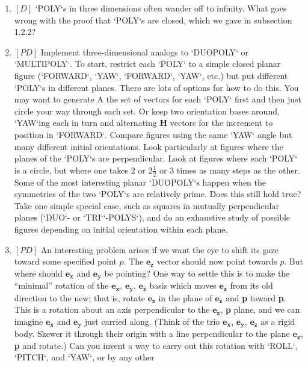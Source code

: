 \documentclass{book}
\begin{document}
\begin{enumerate}
\item $[D]$ \textsc{`POLY`}s in three dimensions often wander off to infinity. What goes
wrong with the proof that \textsc{`POLY`}s are closed, which we gave in subsection
1.2.2?  
\item $[PD]$ Implement three-dimensional analogs to \textsc{`DUOPOLY`} or \textsc{`MULTIPOLY`}.
To start, restrict each \textsc{`POLY`} to a simple closed planar figure (\textsc{`FORWARD`},
\textsc{`YAW`}, \textsc{`FORWARD`}, \textsc{`YAW`}, etc.) but put different \textsc{`POLY`}s in different planes.
There are lots of options for how to do this. You may want to generate A
the set of vectors for each \textsc{`POLY`} first and then just circle your way
through each set. Or keep two orientation bases around, \textsc{`YAW`}ing each in
turn and alternating \textbf{H} vectors for the increment to position in \textsc{`FORWARD`}.
Compare figures using the same \textsc{`YAW`} angle but many different initial
orientations. Look particularly at figures where the planes of the \textsc{`POLY`}s
are perpendicular. Look at figures where each \textsc{`POLY`} is a circle, but where
one takes 2 or 2$\frac{1}{2}$ or 3 times as many steps as the other. Some of the
most interesting planar \textsc{`DUOPOLY`}s happen when the symmetries of the two \textsc{`POLY`}s are relatively prime. Does this still hold true? Take one simple
special case, such as squares in mutually perpendicular planes (\textsc{`DUO`}- or
\textsc{`TRI`}\textsc{`-POLYS`}), and do an exhaustive study of possible figures depending on
initial orientation within each plane.
\item $[PD]$ An interesting problem arises if we want the eye to shift its gaze
toward some specified point $p$. The $\mathbf{e_z}$ vector should now point towards
$p$. But where should $\mathbf{e_x}$ and $\mathbf{e_y}$ be pointing? One way to settle this is
to make the ``minimal'' rotation of the $\mathbf{e_x}$, $\mathbf{e_y}$, $\mathbf{e_z}$ basis which moves $\mathbf{e_z}$
from its old direction to the new; that is, rotate $\mathbf{e_z}$ in the plane of $\mathbf{e_z}$
and \textbf{p} toward \textbf{p}. This is a rotation about an axis perpendicular to the
$\mathbf{e_z}$, \textbf{p} plane, and we can imagine $\mathbf{e_x}$ and $\mathbf{e_y}$ just carried along. (Think of
the trio $\mathbf{e_x}$, $\mathbf{e_y}$, $\mathbf{e_z}$ as a rigid body. Skewer it through their origin with a
line perpendicular to the plane $\mathbf{e_z}$, \textbf{p} and rotate.) Can you invent a way
to carry out this rotation with \textsc{`ROLL`}, \textsc{`PITCH`}, and \textsc{`YAW`}, or by any other

\end{enumerate}
\end{document}
